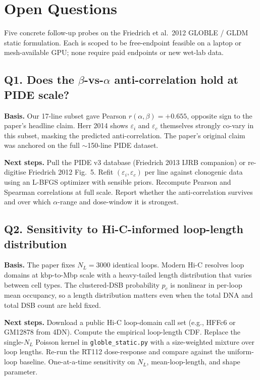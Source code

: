 \section{Open Questions}

Five concrete follow-up probes on the Friedrich et al.\ 2012 GLOBLE / GLDM
static formulation. Each is scoped to be free-endpoint feasible on a laptop or
mesh-available GPU; none require paid endpoints or new wet-lab data.

\subsection*{Q1. Does the $\beta$-vs-$\alpha$ anti-correlation hold at PIDE scale?}

\textbf{Basis.} Our 17-line subset gave Pearson $r(\alpha,\beta)=+0.655$,
opposite sign to the paper's headline claim. Herr 2014 shows $\varepsilon_i$
and $\varepsilon_c$ themselves strongly co-vary in this subset, masking the
predicted anti-correlation. The paper's original claim was anchored on the
full $\sim$150-line PIDE dataset.

\textbf{Next steps.} Pull the PIDE v3 database (Friedrich 2013 IJRB companion)
or re-digitise Friedrich 2012 Fig.~5. Refit
$(\varepsilon_i, \varepsilon_c)$ per line against clonogenic data using an
L-BFGS optimizer with sensible priors. Recompute Pearson and Spearman
correlations at full scale. Report whether the anti-correlation survives and
over which $\alpha$-range and dose-window it is strongest.

\subsection*{Q2. Sensitivity to Hi-C-informed loop-length distribution}

\textbf{Basis.} The paper fixes $N_L = 3000$ identical loops. Modern Hi-C
resolves loop domains at kbp-to-Mbp scale with a heavy-tailed length
distribution that varies between cell types. The clustered-DSB probability
$p_c$ is nonlinear in per-loop mean occupancy, so a length distribution
matters even when the total DNA and total DSB count are held fixed.

\textbf{Next steps.} Download a public Hi-C loop-domain call set
(e.g., HFFc6 or GM12878 from 4DN). Compute the empirical loop-length CDF.
Replace the single-$N_L$ Poisson kernel in \verb|globle_static.py| with a
size-weighted mixture over loop lengths. Re-run the RT112 dose-response and
compare against the uniform-loop baseline. One-at-a-time sensitivity on
$N_L$, mean-loop-length, and shape parameter.


